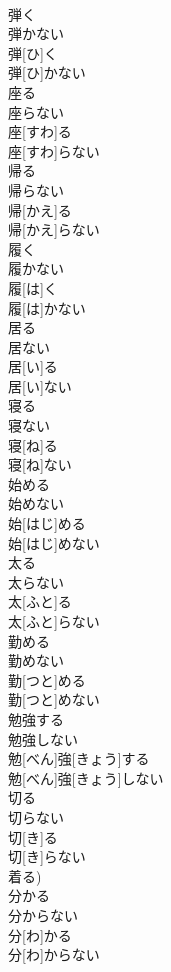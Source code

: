 \documentclass[8pt]{extreport}
\begin{document}
\begin{CJK}{UTF8}{min}
\\	弾く 
\\	弾かない	
\\	弾[ひ]く 
\\	弾[ひ]かない
\\	座る 
\\	座らない	
\\	座[すわ]る 
\\	座[すわ]らない
\\	帰る 
\\	帰らない	
\\	帰[かえ]る 
\\	帰[かえ]らない
\\	履く 
\\	履かない	
\\	履[は]く 
\\	履[は]かない
\\	居る 
\\	居ない	
\\	居[い]る 
\\	居[い]ない
\\	寝る 
\\	寝ない	
\\	寝[ね]る 
\\	寝[ね]ない
\\	始める 
\\	始めない	
\\	始[はじ]める 
\\	始[はじ]めない
\\	太る 
\\	太らない	
\\	太[ふと]る 
\\	太[ふと]らない
\\	勤める 
\\	勤めない	
\\	勤[つと]める 
\\	勤[つと]めない
\\	勉強する 
\\	勉強しない	
\\	勉[べん]強[きょう]する 
\\	勉[べん]強[きょう]しない
\\	切る 
\\	切らない	
\\	切[き]る 
\\	切[き]らない 
\\	着る)
\\	分かる 
\\	分からない	
\\	分[わ]かる 
\\	分[わ]からない

\end{CJK}
\end{document}
